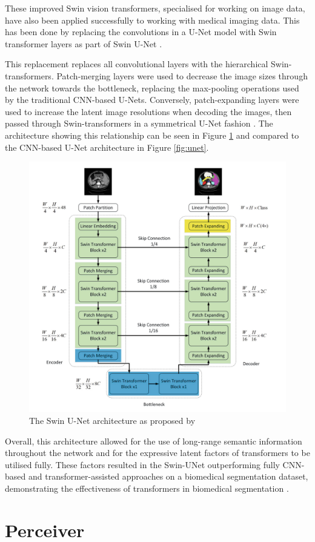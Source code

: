 \documentclass{l4proj}
\begin{document}
These improved Swin vision transformers, specialised for working on image data, have also been applied successfully to working with medical imaging data. This has been done by replacing the convolutions in a U-Net model with Swin transformer layers as part of Swin U-Net \citep{cao2023swin}.

This replacement replaces all convolutional layers with the hierarchical Swin-transformers. Patch-merging layers were used to decrease the image sizes through the network towards the bottleneck, replacing the max-pooling operations used by the traditional CNN-based U-Nets. Conversely, patch-expanding layers were used to increase the latent image resolutions when decoding the images, then passed through Swin-transformers in a symmetrical U-Net fashion \citep{cao2023swin}. The architecture showing this relationship can be seen in Figure \ref{fig:swin_unet} and compared to the CNN-based U-Net architecture in Figure \ref{fig:unet}.

\begin{figure}[htb]
    \centering
    \includegraphics[width=0.5\linewidth]{images/swin_architecture.png}  

    \caption{The Swin U-Net architecture as proposed by \cite{cao2023swin}}

    \label{fig:swin_unet} 
\end{figure}

Overall, this architecture allowed for the use of long-range semantic information throughout the network and for the expressive latent factors of transformers to be utilised fully. These factors resulted in the Swin-UNet outperforming fully CNN-based and transformer-assisted approaches on a biomedical segmentation dataset, demonstrating the effectiveness of transformers in biomedical segmentation \citep{cao2023swin}.

\section{Perceiver}
\end{document}
